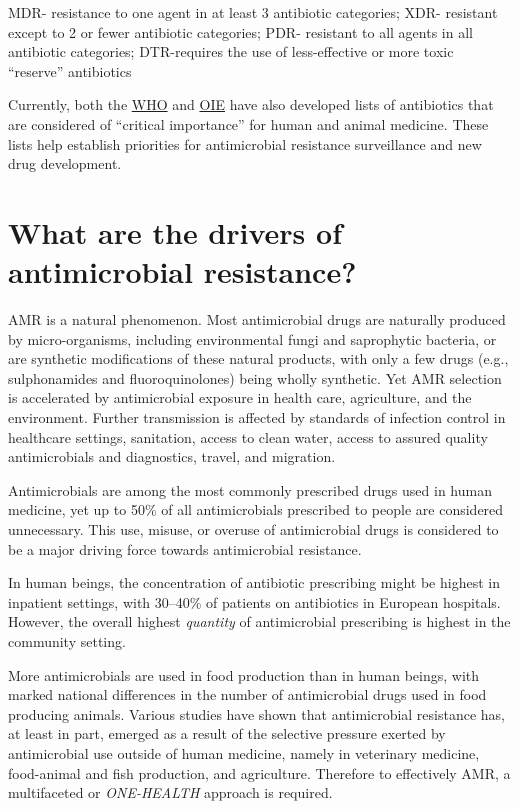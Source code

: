 \documentclass[
]{book}
\begin{document}
MDR- resistance to one agent in at least 3 antibiotic categories; XDR- resistant except to 2 or fewer antibiotic categories; PDR- resistant to all agents in all antibiotic categories; DTR-requires the use of less-effective or more toxic ``reserve'' antibiotics

Currently, both the \href{https://apps.who.int/iris/bitstream/handle/10665/312266/9789241515528-eng.pdf}{WHO} and \href{https://www.oie.int/en/what-we-do/global-initiatives/antimicrobial-resistance/\#ui-id-4}{OIE} have also developed lists of antibiotics that are considered of ``critical importance'' for human and animal medicine. These lists help establish priorities for antimicrobial resistance surveillance and new drug development.

\hypertarget{what-are-the-drivers-of-antimicrobial-resistance}{%
\section*{What are the drivers of antimicrobial resistance?}\label{what-are-the-drivers-of-antimicrobial-resistance}}

AMR is a natural phenomenon. Most antimicrobial drugs are naturally produced by micro-organisms, including environmental fungi and saprophytic bacteria, or are synthetic modifications of these natural products, with only a few drugs (e.g., sulphonamides and fluoroquinolones) being wholly synthetic. Yet AMR selection is accelerated by antimicrobial exposure in health care, agriculture, and the environment. Further transmission is affected by standards of infection control in healthcare settings, sanitation, access to clean water, access to assured quality antimicrobials and diagnostics, travel, and migration.

Antimicrobials are among the most commonly prescribed drugs used in human medicine, yet up to 50\% of all antimicrobials prescribed to people are considered unnecessary. This use, misuse, or overuse of antimicrobial drugs is considered to be a major driving force towards antimicrobial resistance.

In human beings, the concentration of antibiotic prescribing might be highest in inpatient settings, with 30--40\% of patients on antibiotics in European hospitals. However, the overall highest \emph{quantity} of antimicrobial prescribing is highest in the community setting.

More antimicrobials are used in food production than in human beings, with marked national differences in the number of antimicrobial drugs used in food producing animals. Various studies have shown that antimicrobial resistance has, at least in part, emerged as a result of the selective pressure exerted by antimicrobial use outside of human medicine, namely in veterinary medicine, food-animal and fish production, and agriculture. Therefore to effectively AMR, a multifaceted or \emph{ONE-HEALTH} approach is required.
\end{document}
